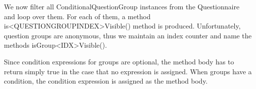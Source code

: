 We now filter all ConditionalQuestionGroup instances from the Questionnaire and
loop over them. For each of them, a method is<QUESTIONGROUPINDEX>Visible()
method is produced. Unfortunately, question groups are anonymous, thus we
maintain an index counter and name the methods isGroup<IDX>Visible().

Since condition expressions for groups are optional, the method body has to
return simply true in the case that no expression is assigned. When groups have
a condition, the condition expression is assigned as the method body.


